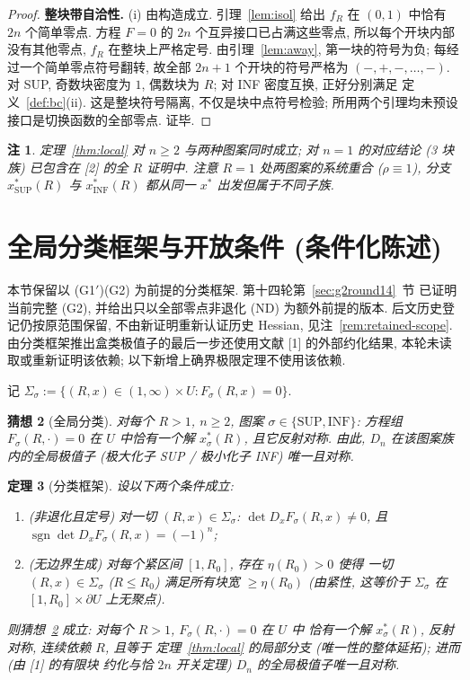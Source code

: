 \documentclass[UTF8]{ctexart}
\newtheorem{theorem}{定理}[section]
\newtheorem{remark}[theorem]{注}
\newtheorem{conjecture}[theorem]{猜想}
\begin{document}
\begin{proof}
\textbf{整块带自洽性.} (i) 由构造成立. 引理~\ref{lem:isol} 给出 $f_R$ 在
$(0,1)$ 中恰有 $2n$ 个简单零点. 方程 $F=0$ 的 $2n$ 个互异接口已占满这些零点,
所以每个开块内部没有其他零点, $f_R$ 在整块上严格定号.
由引理~\ref{lem:away}, 第一块的符号为负; 每经过一个简单零点符号翻转,
故全部 $2n+1$ 个开块的符号严格为 $(-,+,-,\dots,-)$.
对 SUP, 奇数块密度为 $1$, 偶数块为 $R$; 对 INF 密度互换, 正好分别满足
定义~\ref{def:bc}(ii). 这是整块符号隔离, 不仅是块中点符号检验;
所用两个引理均未预设接口是切换函数的全部零点. 证毕.
\end{proof}

\begin{remark}
定理~\ref{thm:local} 对 $n\ge2$ 与两种图案同时成立; 对 $n=1$ 的对应结论
(3 块族) 已包含在 [2] 的全 $R$ 证明中. 注意 $R=1$ 处两图案的系统重合
($\rho\equiv1$), 分支 $x_\mathrm{SUP}^*(R)$ 与 $x_\mathrm{INF}^*(R)$ 都从同一
$x^*$ 出发但属于不同子族.
\end{remark}

\section{全局分类框架与开放条件 (条件化陈述)}\label{sec:global}

本节保留以 (G1$'$)(G2) 为前提的分类框架. 第十四轮第~\ref{sec:g2round14}~节
已证明当前完整 (G2), 并给出只以全部零点非退化 (ND) 为额外前提的版本.
后文历史登记仍按原范围保留, 不由新证明重新认证历史 Hessian, 见注~\ref{rem:retained-scope}.
由分类框架推出盒类极值子的最后一步还使用文献 [1] 的外部约化结果,
本轮未读取或重新证明该依赖; 以下新增上确界极限定理不使用该依赖.

记 $\Sigma_\sigma:=\{(R,x)\in(1,\infty)\times U: F_\sigma(R,x)=0\}$.

\begin{conjecture}[全局分类]\label{conj:global}
对每个 $R>1$, $n\ge2$, 图案 $\sigma\in\{\mathrm{SUP},\mathrm{INF}\}$:
方程组 $F_\sigma(R,\cdot)=0$ 在 $U$ 中恰有一个解 $x_\sigma^*(R)$, 且它反射对称.
由此, $D_n$ 在该图案族内的全局极值子 (极大化子 SUP / 极小化子 INF) 唯一且对称.
\end{conjecture}

\begin{theorem}[分类框架]\label{thm:framework}
设以下两个条件成立:
\begin{enumerate}
	\item[(G1$'$)] (非退化且定号) 对一切 $(R,x)\in\Sigma_\sigma$:
	$\det D_xF_\sigma(R,x)\neq0$, 且 $\operatorname{sgn}\det D_xF_\sigma(R,x)=(-1)^n$;
	\item[(G2)] (无边界生成) 对每个紧区间 $[1,R_0]$, 存在 $\eta(R_0)>0$ 使得
	一切 $(R,x)\in\Sigma_\sigma$ ($R\le R_0$) 满足所有块宽 $\ge\eta(R_0)$
	(由紧性, 这等价于 $\Sigma_\sigma$ 在 $[1,R_0]\times\partial U$ 上无聚点).
\end{enumerate}
则猜想~\ref{conj:global} 成立: 对每个 $R>1$, $F_\sigma(R,\cdot)=0$ 在 $U$ 中
恰有一个解 $x_\sigma^*(R)$, 反射对称, 连续依赖 $R$, 且等于
定理~\ref{thm:local} 的局部分支 (唯一性的整体延拓); 进而 (由 [1] 的有限块
约化与恰 $2n$ 开关定理) $D_n$ 的全局极值子唯一且对称.
\end{theorem}
\end{document}
